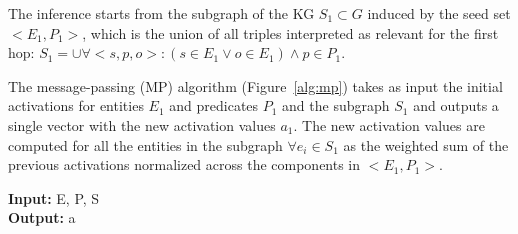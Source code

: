 








The inference starts from the subgraph of the KG $S_1 \subset G$ induced by the seed set $<E_1, P_1>$, which is the union of all triples interpreted as relevant for the first hop:
$S_1 = \cup \forall <s, p, o>:  (s\in E_1 \lor o\in E_1) \land p\in P_1$.

The message-passing (MP) algorithm (Figure~\ref{alg:mp}) takes as input the initial activations for entities $E_1$ and predicates $P_1$ and the subgraph $S_1$ and outputs a single vector with the new activation values $a_1$. 
The new activation values are computed for all the entities in the subgraph $\forall e_i \in S_1$ as the weighted sum of the previous activations normalized across the components in $<E_1, P_1>$.



\begin{algorithm}
\caption{MP algorithm}\label{alg:mp}
\begin{flushleft}
\textbf{Input:} E, P, S\\
\textbf{Output:} a
\end{flushleft}
\begin{algorithmic}[1]

\end{algorithmic}
\end{algorithm}

